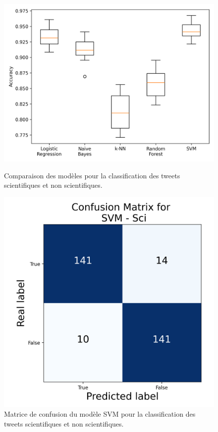\vfill
\begin{figure}[H]
    \centering
    \begin{minipage}[b]{0.55\textwidth}
        \centering
        \includegraphics[width=\textwidth]{images/model_comparison_1}
        \caption{Comparaison des modèles pour la classification des tweets scientifiques et non scientifiques.}
        \label{fig:model_comparison_sci_nsci}
    \end{minipage}\hfill
    \begin{minipage}[b]{0.4\textwidth}
        \centering
        \includegraphics[width=\textwidth]{images/confusion_1.json-SVM_Sci_confusion_matrix}
        \caption{Matrice de confusion du modèle SVM pour la classification des tweets scientifiques et non scientifiques.}
        \label{fig:confusion_1.json-SVM_sci_confusion_matrix}
    \end{minipage}
\end{figure}
\newpage

